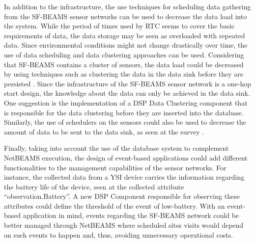 In addition to the infrastructure, the use techniques for scheduling data
gathering from the SF-BEAMS sensor networks can be used to decrease the data
load into the system. While the period of times used by RTC seems
to cover the basic requirements of data, the data storage may be
seen as overloaded with repeated data. Since environmental conditions
might not change drastically over time, the use of data scheduling and
data clustering approaches can be used. Considering that SF-BEAMS
contains a cluster of sensors, the data load could be decreased by using
techniques such as clustering the data in the data sink before they are
persisted \cite{sn-time-series, sn-schedule-minimal-aggregation-time}. Since
the infrastructure of the SF-BEAMS sensor network is a one-hop start design,
the knowledge about the data can only be achieved in the data sink. One
suggestion is the implementation of a DSP Data Clustering component that is
responsible for the data clustering before they are inserted into the
database. Similarly, the use of schedulers on the sensors could also be used
to decrease the amount of data to be sent to the data sink, as seen at the
survey \cite{sn-scheduling-survey}.

Finally, taking into account the use of the database system to complement
NetBEAMS execution, the design of event-based applications could add different
functionalities to the management capabilities of the sensor networks. For
instance, the collected data from a YSI device \cite{YSI-Sonde} carries the
information regarding the battery life of the device, seen at the collected
attribute ``observation.Battery''. A new DSP Component responsible for
observing these attributes could define the threshold of the event of
low-battery. With an event-based application in mind, events regarding the
SF-BEAMS network could be better managed through NetBEAMS where scheduled
sites visits would depend on such events to happen and, thus, avoiding
unnecessary operational costs.

